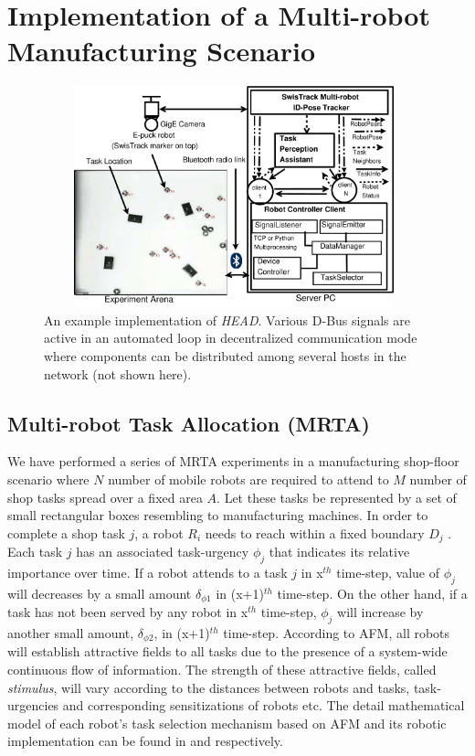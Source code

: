 \documentclass{ifacconf}
\begin{document}
\section{Implementation of a Multi-robot Manufacturing Scenario}
\label{sec:impl}
\begin{figure}
\begin{center}
\includegraphics[width=11cm,height=6.4cm]{./dia-files/RIL-Expt-Setup3}    %
\caption{An example implementation of {\em HEAD}. Various D-Bus signals are active in an automated loop in decentralized communication mode where components can be distributed among several hosts in the network (not shown here).} 
\label{fig:setup}
\end{center}
\end{figure}
\subsection{Multi-robot Task Allocation (MRTA)}
We have performed a series of MRTA experiments in a manufacturing shop-floor scenario where $N$ number of mobile robots are required to attend to $M$ number of shop tasks spread over a fixed area $A$. Let these tasks be represented by a set of small rectangular boxes resembling to manufacturing machines. In order to complete a shop task $j$, a robot $R_i$ needs to reach within a fixed boundary $D_{j}$ . Each task $j$ has an associated task-urgency $\phi_j$ that indicates its relative importance over time. If a robot attends to a task $j$ in x$^{th}$ time-step, value of $\phi_j$ will decreases by a small amount $\delta_{\phi 1}$ in (x+1)$^{th}$ time-step. On the other hand, if a task has not been served by any robot in x$^{th}$ time-step, $\phi_j$ will increase by another small amount, $\delta_{\phi 2}$, in (x+1)$^{th}$ time-step. According to AFM, all robots will establish attractive fields to all tasks due to the presence of a system-wide continuous flow of information. The strength of these attractive fields, called {\em stimulus}, will vary according to the distances between robots and tasks, task-urgencies and corresponding sensitizations of robots etc. The detail mathematical model of each robot's task selection mechanism based on AFM and its robotic implementation can be found in \cite{Arcaute+2008} and \cite{Sarker+2010ants} respectively.
\end{document}
